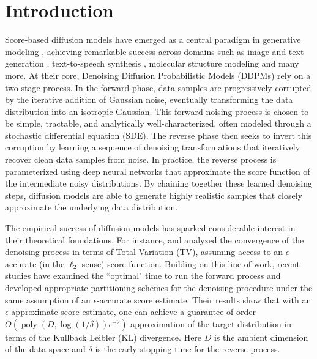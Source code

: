 \documentclass[12pts]{article}
\begin{document}
\section{Introduction}
Score-based diffusion models have emerged as a central paradigm in generative modeling \citep{pmlr-v37-sohl-dickstein15,song2019generative, ho2020denoising,songscore}, achieving remarkable success across domains such as image and text generation \citep{dhariwal2021diffusion,austin2021structured,10.5555/3600270.3602913}, text-to-speech synthesis \citep{pmlr-v139-popov21a}, molecular structure modeling \citep{xu2022geodiff,trippe2023diffusion,watson2023novo} and many more. At their core, Denoising Diffusion Probabilistic Models (DDPMs) \citep{ho2020denoising} rely on a two-stage process. In the forward phase, data samples are progressively corrupted by the iterative addition of Gaussian noise, eventually transforming the data distribution into an isotropic Gaussian. This forward noising process is chosen to be simple, tractable, and analytically well-characterized, often modeled through a stochastic differential equation (SDE). The reverse phase then seeks to invert this corruption by learning a sequence of denoising transformations that iteratively recover clean data samples from noise. In practice, the reverse process is parameterized using deep neural networks that approximate the  score function of the intermediate noisy distributions. By chaining together these learned denoising steps, diffusion models are able to generate highly realistic samples that closely approximate the underlying data distribution.

The empirical success of diffusion models has sparked considerable interest in their theoretical foundations. For instance, \citet{chen2023sampling} and \citet{lee2023convergence} analyzed the convergence of the denoising process in terms of Total Variation (TV), assuming access to an $\epsilon$-accurate (in the $\ell_2$ sense) score function. Building on this line of work, recent studies \citep{chen2023improved,li2023towards,benton2024nearly} have examined the ``optimal"  time to run the forward process and developed appropriate partitioning schemes for the denoising procedure under the same assumption of an $\epsilon$-accurate score estimate. Their results show that with an $\epsilon$-approximate score estimate, one can achieve a guarantee of order $O(\operatorname{poly}(D, \log(1/\delta))\epsilon^{-2})$-approximation of the target distribution in terms of the Kullback Leibler (KL) divergence. Here $D$ is the ambient dimension of the data space and $\delta$ is the early stopping time for the reverse process.
\end{document}
